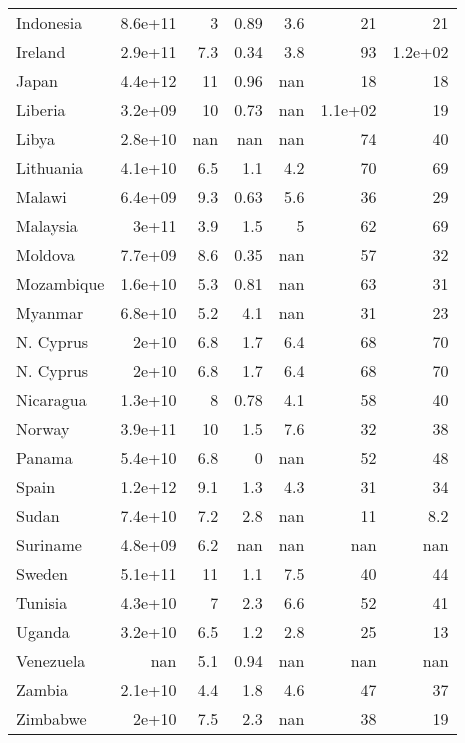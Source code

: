 \begin{table}
\begin{tabular}{lrrrrrr}
        Indonesia     & 8.6e+11 & 3      & 0.89     & 3.6       & 21      & 21      \\
        Ireland       & 2.9e+11 & 7.3    & 0.34     & 3.8       & 93      & 1.2e+02 \\
        Japan         & 4.4e+12 & 11     & 0.96     & nan       & 18      & 18      \\
        Liberia       & 3.2e+09 & 10     & 0.73     & nan       & 1.1e+02 & 19      \\
        Libya         & 2.8e+10 & nan    & nan      & nan       & 74      & 40      \\
        Lithuania     & 4.1e+10 & 6.5    & 1.1      & 4.2       & 70      & 69      \\
        Malawi        & 6.4e+09 & 9.3    & 0.63     & 5.6       & 36      & 29      \\
        Malaysia      & 3e+11   & 3.9    & 1.5      & 5         & 62      & 69      \\
        Moldova       & 7.7e+09 & 8.6    & 0.35     & nan       & 57      & 32      \\
        Mozambique    & 1.6e+10 & 5.3    & 0.81     & nan       & 63      & 31      \\
        Myanmar       & 6.8e+10 & 5.2    & 4.1      & nan       & 31      & 23      \\
        N. Cyprus     & 2e+10   & 6.8    & 1.7      & 6.4       & 68      & 70      \\
        N. Cyprus     & 2e+10   & 6.8    & 1.7      & 6.4       & 68      & 70      \\
        Nicaragua     & 1.3e+10 & 8      & 0.78     & 4.1       & 58      & 40      \\
        Norway        & 3.9e+11 & 10     & 1.5      & 7.6       & 32      & 38      \\
        Panama        & 5.4e+10 & 6.8    & 0        & nan       & 52      & 48      \\
        Spain         & 1.2e+12 & 9.1    & 1.3      & 4.3       & 31      & 34      \\
        Sudan         & 7.4e+10 & 7.2    & 2.8      & nan       & 11      & 8.2     \\
        Suriname      & 4.8e+09 & 6.2    & nan      & nan       & nan     & nan     \\
        Sweden        & 5.1e+11 & 11     & 1.1      & 7.5       & 40      & 44      \\
        Tunisia       & 4.3e+10 & 7      & 2.3      & 6.6       & 52      & 41      \\
        Uganda        & 3.2e+10 & 6.5    & 1.2      & 2.8       & 25      & 13      \\
        Venezuela     & nan     & 5.1    & 0.94     & nan       & nan     & nan     \\
        Zambia        & 2.1e+10 & 4.4    & 1.8      & 4.6       & 47      & 37      \\
        Zimbabwe      & 2e+10   & 7.5    & 2.3      & nan       & 38      & 19      \\
        \bottomrule
    \end{tabular}
\end{table}
